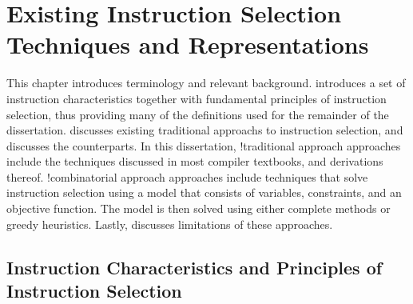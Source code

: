 %

\chapter{Existing Instruction Selection Techniques and Representations}

This chapter introduces terminology and relevant background.
%
 introduces a set of
\glspl{instruction characteristic} together with fundamental \glspl{principle}
of \gls{instruction selection}, thus providing many of the definitions used for
the remainder of the dissertation.
%
 discusses existing
\glspl{traditional approach} to \gls{instruction selection}, and
 discusses the
 counterparts.
%
In this dissertation, \glsshort!{traditional approach} approaches include the
techniques discussed in most \gls{compiler} textbooks, and derivations thereof.
%
\Glsshort!{combinatorial approach} approaches include techniques that solve
\gls{instruction selection} using a model that consists of \glspl{variable},
\glspl{constraint}, and an objective function.
%
The model is then solved using either complete methods or greedy heuristics.
%
Lastly,  discusses
limitations of these approaches.



\section{Instruction Characteristics and Principles of Instruction Selection}

